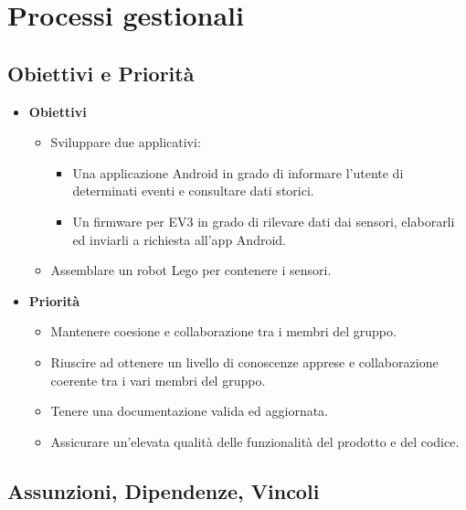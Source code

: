 \documentclass{article}
\begin{document}
  \section{Processi gestionali}
  
  \subsection{Obiettivi e Priorità}
  
  \begin{itemize}
  \item
    \textbf{Obiettivi}
  
    \begin{itemize}
    \item
      Sviluppare due applicativi:
  
      \begin{itemize}
      \item
        Una applicazione Android in grado di informare l'utente di determinati eventi e consultare dati storici.
      \item
        Un firmware per EV3 in grado di rilevare dati dai sensori, elaborarli ed inviarli a richiesta all'app Android.
      \end{itemize}
    \item
      Assemblare un robot Lego per contenere i sensori.
    \end{itemize}
  \item
    \textbf{Priorità}
  
    \begin{itemize}
    \item
      Mantenere coesione e collaborazione tra i membri del gruppo.
    \item
      Riuscire ad ottenere un livello di conoscenze apprese e collaborazione coerente tra i vari membri del gruppo.
    \item
      Tenere una documentazione valida ed aggiornata.
    \item
      Assicurare un'elevata qualità delle funzionalità del prodotto e del
      codice.
    \end{itemize}
  \end{itemize}
  
  \subsection{Assunzioni, Dipendenze,
  Vincoli}
  
\end{document}
